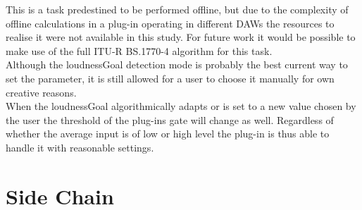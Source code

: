 This is a task predestined to be performed offline, but due to the complexity of offline calculations in a plug-in operating in different DAWs the resources to realise it were not available in this study. For future work it would be possible to make use of the full ITU-R BS.1770-4\cite{ITUalgo} algorithm for this task.\\
Although the loudnessGoal detection mode is probably the best current way to set the parameter, it is still allowed for a user to choose it manually for own creative reasons.\\
When the loudnessGoal algorithmically adapts or is set to a new value chosen by the user the threshold of the plug-ins gate will change as well. Regardless of whether the average input is of low or high level the plug-in is thus able to handle it with reasonable settings.\\

\section{Side Chain}

